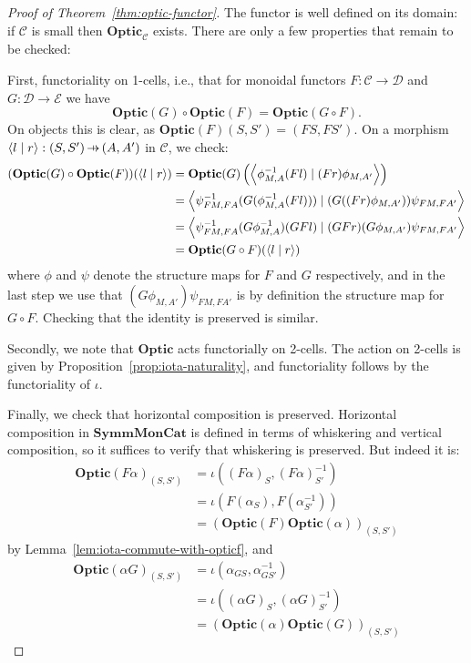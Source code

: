 \documentclass[11pt,letterpaper]{article}
\theoremstyle{plain}
\theoremstyle{definition}
\newcommand{\C}{\mathscr{C}}
\newcommand{\D}{\mathscr{D}}
\newcommand{\E}{\mathscr{E}}
\newcommand{\SymmMonCat}{\mathbf{SymmMonCat}}
\newcommand{\Optic}{\mathbf{Optic}}
\newcommand{\rep}[2]{{\ensuremath \left\langle #1 \mid #2 \right\rangle}}
\newcommand{\hto}{\ensuremath{\,\mathaccent\shortmid\rightarrow\,}}
\begin{document}
\begin{proof}[Proof of Theorem~\ref{thm:optic-functor}]
The functor is well defined on its domain: if $\C$ is small then $\Optic_\C$ exists. There are only a few properties that remain to be checked:

First, functoriality on 1-cells, i.e., that for monoidal functors $F : \C \to \D$ and $G : \D \to \E$ we have
\[ \Optic(G) \circ \Optic(F) = \Optic(G \circ F).\]
On objects this is clear, as $\Optic(F)(S, S') = (FS, FS')$. On a morphism $\rep{l}{r} : (S, S') \hto (A, A')$ in $\C$, we check:
\begin{align*}
(\Optic(G) \circ \Optic(F))(\rep{l}{r})
&= \Optic(G) \left(\rep{\phi^{-1}_{M,A} (Fl)}{(Fr) \phi_{M,A'}}\right) \\
&= \rep{\psi^{-1}_{FM,FA} (G(\phi^{-1}_{M,A} (Fl)))}{(G((Fr) \phi_{M,A'}))\psi_{FM,FA'}} \\
&= \rep{\psi^{-1}_{FM,FA} (G\phi^{-1}_{M,A}) (GFl)}{(GFr) (G\phi_{M,A'})\psi_{FM,FA'}} \\
&=\Optic(G \circ F)(\rep{l}{r})
\end{align*}
where $\phi$ and $\psi$ denote the structure maps for $F$ and $G$ respectively, and in the last step we use that $(G\phi_{M,A'})\psi_{FM,FA'}$ is by definition the structure map for $G \circ F$. Checking that the identity is preserved is similar.

Secondly, we note that $\Optic$ acts functorially on 2-cells. The action on 2-cells is given by Proposition~\ref{prop:iota-naturality}, and functoriality follows by the functoriality of $\iota$.

Finally, we check that horizontal composition is preserved. Horizontal composition in $\SymmMonCat$ is defined in terms of whiskering and vertical composition, so it suffices to verify that whiskering is preserved. But indeed it is:
\begin{align*}
{\Optic(F\alpha)}_{(S, S')}
&= \iota({(F\alpha)}_{S}, {(F\alpha)}^{-1}_{S'}) \\
&= \iota(F(\alpha_{S}), F(\alpha_{S'}^{-1})) \\
&= {(\Optic(F)\Optic(\alpha))}_{(S, S')}
\end{align*}
by Lemma~\ref{lem:iota-commute-with-opticf}, and
\begin{align*}
{\Optic(\alpha G)}_{(S, S')}
&= \iota(\alpha_{GS}, \alpha_{GS'}^{-1}) \\
&= \iota({(\alpha G)}_{S}, {(\alpha G)}_{S'}^{-1}) \\
&= {(\Optic(\alpha)\Optic(G))}_{(S, S')}
\end{align*}
\end{proof}
\end{document}
